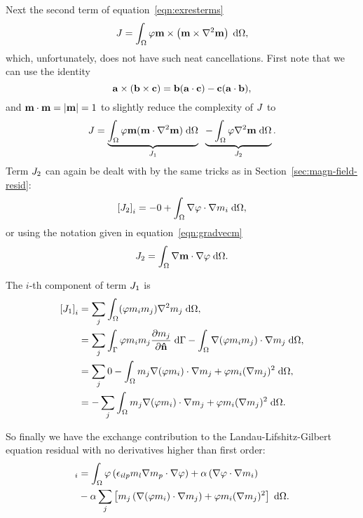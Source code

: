 Next the second term of equation~\eqref{eqn:exresterms}
\begin{equation}
  J = \int_\Omega \varphi \mathbf{m} \times \left( \mathbf{m} \times \nabla^2 \mathbf{m} \right) {\; \text{d}}\Omega, \notag
\end{equation}
which, unfortunately, does not have such neat cancellations.
First note that we can use the identity
\begin{equation}
  {\mathbf{a}} \times ( {\mathbf{b}} \times {\mathbf{c}} ) = {\mathbf{b}} ( {\mathbf{a}} \cdot {\mathbf{c}}) - {\mathbf{c}} ( {\mathbf{a}} \cdot {\mathbf{b}}),
  \label{eqn:double-cross-id}
\end{equation}
and $\mathbf{m} \cdot \mathbf{m} = \lvert \mathbf{m} \rvert = 1$ to slightly reduce the complexity of $J$ to
\begin{equation}
  J = \underbrace{\int_\Omega \varphi \mathbf{m} (\mathbf{m} \cdot \nabla^2 \mathbf{m}) {\; \text{d}}\Omega}_{J_1} \;\;
  \underbrace{- \int_\Omega \varphi \nabla^2 \mathbf{m}  {\; \text{d}}\Omega}_{J_2}.
\end{equation}
Term $J_2$ can again be dealt with by the same tricks as in Section~\ref{sec:magn-field-resid}:
\begin{equation}
  \left[ J_2 \right]_i = -0 + \int_\Omega \nabla \varphi \cdot \nabla m_i {\; \text{d}}\Omega,
\end{equation}
or using the notation given in equation~\eqref{eqn:gradvecm}
\begin{equation}
  J_2 = \int_\Omega \nabla \mathbf{m} \cdot \nabla \varphi  {\; \text{d}}\Omega.
\end{equation}

The $i$-th component of term $J_1$ is
\begin{align}
  \left[J_1\right]_i &= \sum_j \int_\Omega (\varphi m_i  m_j) \nabla^2 m_j {\; \text{d}}\Omega, \notag \\
  &= \sum_j \int_{\Gamma} \varphi  m_i  m_j \frac{\partial m_j}{\partial \mathbf{\hat{n}}} {\; \text{d}}{\Gamma}
  - \int_\Omega  \nabla(\varphi m_i  m_j) \cdot \nabla m_j  {\; \text{d}}\Omega, \notag \\
  &= \sum_j 0 - \int_\Omega m_j \nabla(\varphi m_i) \cdot \nabla m_j
  + \varphi m_i (\nabla m_j)^2 {\; \text{d}}\Omega, \notag \\
  &= - \sum_j \int_\Omega m_j \nabla(\varphi m_i) \cdot \nabla m_j
  + \varphi m_i (\nabla m_j)^2 {\; \text{d}}\Omega.
\end{align}

So finally we have the exchange contribution to the Landau-Lifshitz-Gilbert equation residual with no derivatives higher than first order:
\begin{align}
  [\rex]_i &= \int_\magd \tbf\left(  \epsilon_{ilp} m_l\nabla m_p \cdot \nabla \tbf \right)
  + \dampc \left(\nabla \tbf \cdot \nabla m_i \right) \notag\\
  &- \dampc \sum_j \left[ m_j
    \left(\nabla(\tbf m_i) \cdot \nabla m_j \right)
    + \tbf m_i (\nabla m_j)^2 \right] \d\magd.
\end{align}


